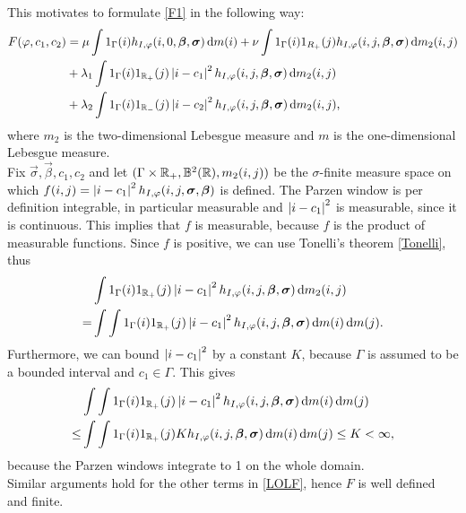 This motivates to formulate \eqref{F1} in the following way:
\begin{equation}
  \begin{split}
    F(\phi,c_1,c_2) &= \mu \int 1_\Gamma(i) h_{I,\phi}(i,0,\vec{\beta},\vec{\sigma})\df m(i) + \nu\int 1_{\Gamma}(i)1_{R_+}(j) h_{I,\phi}(i,j,\vec{\beta},\vec{\sigma})\df m_2(i,j)\\
    &+ \lambda_1\int 1_\Gamma(i) 1_{\R_+}(j) \abs{i-c_1}^2h_{I,\phi}(i,j,\vec{\beta},\vec{\sigma})\df m_2(i, j)\\
    &+ \lambda_2\int 1_\Gamma(i) 1_{\R_-}(j) \abs{i-c_2}^2h_{I,\phi}(i,j,\vec{\beta},\vec{\sigma})\df m_2(i, j),
  \end{split}\label{LOLF}
\end{equation}
where $m_2$ is the two-dimensional Lebesgue measure and $m$ is the one-dimensional Lebesgue measure.\\
Fix $\vec{\sigma}, \vec{\beta}, c_1, c_2$ and let $(\Gamma\times \mathbb R_+,\mathbb{B}^2(\mathbb R),m_2(i,j))$ be the $\sigma$-finite measure space on which $f(i,j) = \left| {i-c_1} \right|^2h_{I,\varphi}(i,j,\boldsymbol{\sigma} ,\boldsymbol{\beta} )$ is defined. The Parzen window is per definition integrable, in particular measurable and $\left| {i-c_1} \right|^2$ is measurable, since it is continuous. This implies that $f$ is measurable, because $f$ is the product of measurable functions. Since $f$ is positive, we can use Tonelli's theorem \eqref{Tonelli}, thus
\begin{equation}
  \begin{split}
    &\int 1_\Gamma(i) 1_{\mathbb R_+}(j) \left| {i-c_1} \right|^2h_{I,\varphi}(i,j,\boldsymbol{\beta} ,\boldsymbol{\sigma} )\,{\rm d} m_2(i, j)\\
    = &\int\int 1_\Gamma(i) 1_{\mathbb R_+}(j) \left| {i-c_1} \right|^2h_{I,\varphi}(i,j,\boldsymbol{\beta} ,\boldsymbol{\sigma} )\,{\rm d} m(i) \,{\rm d} m(j).
  \end{split}
\end{equation}
Furthermore, we can bound $\left| {i-c_1} \right|^2$ by a constant $K$, because $\Gamma$ is assumed to be a bounded interval and $c_1\in\Gamma$. This gives
\begin{equation}
  \begin{split}
    &\int\int 1_\Gamma(i) 1_{\mathbb R_+}(j) \left| {i-c_1} \right|^2h_{I,\varphi}(i,j,\boldsymbol{\beta} ,\boldsymbol{\sigma} )\,{\rm d} m(i) \,{\rm d} m(j)\\
    \leq &\int\int 1_\Gamma(i) 1_{\mathbb R_+}(j) K h_{I,\varphi}(i,j,\boldsymbol{\beta} ,\boldsymbol{\sigma} )\,{\rm d} m(i) \,{\rm d} m(j) \leq K < \infty,
  \end{split}
\end{equation}
because the Parzen windows integrate to 1 on the whole domain.\\
Similar arguments hold for the other terms in \eqref{LOLF}, hence $F$ is well defined and finite.\\

